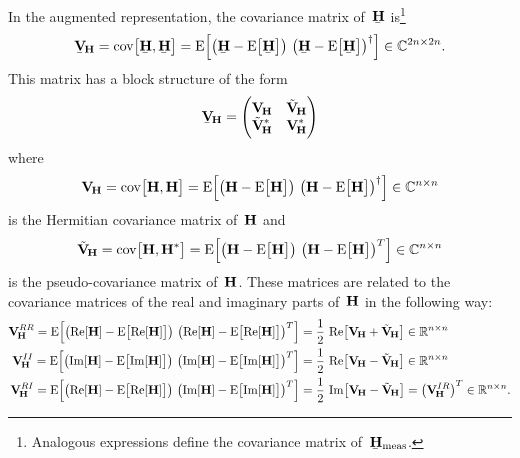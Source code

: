 In the augmented representation, the covariance matrix
of~$\underaccent{\bar}{\vect{H}}$ is\footnote{Analogous expressions
define the covariance matrix
of~$\underaccent{\bar}{\vect{H}}_\text{meas}$.}
\begin{equation}
  \underaccent{\bar}{\covMatSym}_{\!\vect{H}}
  = \cov[1]{\underaccent{\bar}{\vect{H}}, \underaccent{\bar}{\vect{H}}}
  = \exptVal[2]{\rBrk[1]{\underaccent{\bar}{\vect{H}} - \exptVal[1]{\underaccent{\bar}{\vect{H}}}}\,
  \rBrk[1]{\underaccent{\bar}{\vect{H}} - \exptVal[1]{\underaccent{\bar}{\vect{H}}}}^\dagger}
  \in \mathbb{C}^{2n \times 2n}.
\end{equation}
This matrix has a block structure of the form
\begin{equation}
  \label{eq:cov_augmented}
  \underaccent{\bar}{\covMatSym}_{\!\vect{H}}
  = \begin{pmatrix*}[l]
    \covMatSym_{\!\vect{H}} & \tilde{\covMatSym}_{\!\vect{H}} \\
    \tilde{\covMatSym}_{\!\vect{H}}^* & \covMatSym_{\!\vect{H}}^*
  \end{pmatrix*}
\end{equation}
where
\begin{equation}
  \covMatSym_{\!\vect{H}}
  = \cov[1]{\vect{H}, \vect{H}}
  = \exptVal[2]{\rBrk[1]{\vect{H} - \exptVal[1]{\vect{H}}}\, \rBrk[1]{\vect{H} - \exptVal[1]{\vect{H}}}^\dagger}
  \in \mathbb{C}^{n \times n}
\end{equation}
is the Hermitian covariance matrix of~$\bm{\mathrm{H}}$ and
\begin{equation}
  \tilde{\covMatSym}_{\!\vect{H}}
  = \cov[1]{\vect{H}, \vect{H}^*}
  = \exptVal[2]{\rBrk[1]{\vect{H} - \exptVal[1]{\vect{H}}}\, \rBrk[1]{\vect{H} - \exptVal[1]{\vect{H}}}^T}
  \in \mathbb{C}^{n \times n}
\end{equation}
is the pseudo-covariance matrix of~$\bm{\mathrm{H}}$.  These matrices are
related to the covariance matrices of the real and imaginary parts
of~$\bm{\mathrm{H}}$ in the following way:
\begin{align}
  \label{eq:cov_ReRe}
  \covMatSym_{\!\vect{H}}^{RR}
  = \exptVal[2]{\rBrk[1]{\Re{\vect{H}} - \exptVal[1]{\Re{\vect{H}}}}\, \rBrk[1]{\Re{\vect{H}} - \exptVal[1]{\Re{\vect{H}}}}^T}
  ={}& \frac{1}{2}\, \Re[1]{\covMatSym_{\!\vect{H}} + \tilde{\covMatSym}_{\!\vect{H}}}
  \in \mathbb{R}^{n \times n}
  \\
  \label{eq:cov_ImIm}
  \covMatSym_{\!\vect{H}}^{II}
  = \exptVal[2]{\rBrk[1]{\Im{\vect{H}} - \exptVal[1]{\Im{\vect{H}}}}\, \rBrk[1]{\Im{\vect{H}} - \exptVal[1]{\Im{\vect{H}}}}^T}
  ={}& \frac{1}{2}\, \Re[1]{\covMatSym_{\!\vect{H}} - \tilde{\covMatSym}_{\!\vect{H}}}
  \in \mathbb{R}^{n \times n}
  \\
  \label{eq:cov_ReIm}
  \covMatSym_{\!\vect{H}}^{RI}
  = \exptVal[2]{\rBrk[1]{\Re{\vect{H}} - \exptVal[1]{\Re{\vect{H}}}}\, \rBrk[1]{\Im{\vect{H}} - \exptVal[1]{\Im{\vect{H}}}}^T}
  ={}& \frac{1}{2}\, \Im[1]{\covMatSym_{\!\vect{H}} - \tilde{\covMatSym}_{\!\vect{H}}}
  = \rBrk[1]{\covMatSym_{\!\vect{H}}^{IR}}^T
  \in \mathbb{R}^{n \times n}.
\end{align}
